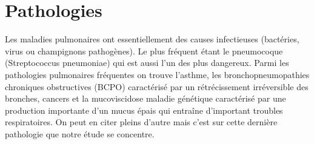 		\section{Pathologies}
Les maladies pulmonaires ont essentiellement des causes infectieuses (bactéries, virus ou champignons pathogènes). Le plus fréquent étant le pneumocoque (Streptococcus pneumoniae) qui est aussi l’un des plus dangereux. 
Parmi les pathologies pulmonaires fréquentes on trouve l’asthme, les bronchopneumopathies chroniques obstructives (BCPO) caractérisé par un rétrécissement irréversible des bronches, cancers et la mucoviscidose maladie génétique caractérisé par une production importante d’un mucus épais qui entraîne d’important troubles respiratoires. On peut en citer pleins d’autre mais c’est sur cette dernière pathologie que notre étude se concentre.






